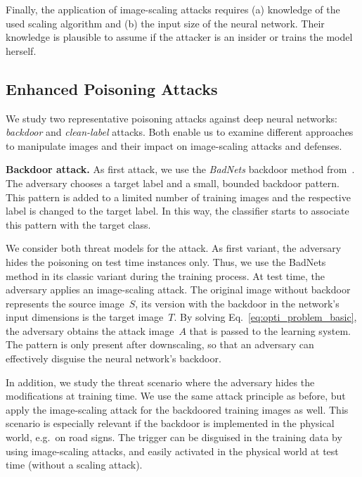 \documentclass[conference]{IEEEtran}
\renewcommand{\paragraph}[1]{{\vskip 8pt \noindent\bf #1 }}
\newcommand{\srcimg}{\ensuremath{S}\xspace}
\newcommand{\tarimg}{\ensuremath{T}\xspace}
\newcommand{\attimg}{\ensuremath{A}\xspace}
\begin{document}
\vspace{0.5em}
Finally, the application of image-scaling attacks
requires (a) knowledge of the used scaling algorithm and (b) the input 
size of the neural network. Their knowledge is plausible to assume if 
the attacker is an insider or trains the model herself.





\subsection{Enhanced Poisoning Attacks}
\label{subsec:poisoningwithimagescaling}
We study two representative poisoning attacks against deep neural 
networks: \emph{backdoor} and \emph{clean-label} attacks.
Both enable us to examine different {approaches\EndAccSupp{}} to manipulate images and 
their impact on image-scaling attacks and defenses. 


\paragraph{Backdoor attack.}
As first attack, we use the \emph{BadNets} backdoor method 
from~\citet{GuDolGar17}. The adversary chooses a target label and a 
small, bounded backdoor pattern. This pattern is added to a limited 
number of training images and the respective label is changed to the 
target label. In this way, the classifier starts to associate this 
pattern with the target class.

We consider both threat models for the attack. As first variant, the 
adversary hides the poisoning on test time instances only. Thus, 
we use the BadNets method in its classic variant during the training 
process.
At test time, the adversary {applies\EndAccSupp{}} an image-scaling attack. The 
original image without backdoor represents the source image~\srcimg, 
its version with the backdoor in the network's input dimensions is the 
target image~\tarimg. By solving Eq.~\eqref{eq:opti_problem_basic}, the 
adversary obtains the attack image~\attimg that is passed to the 
learning system.
The pattern is only present after downscaling, so that an adversary can 
effectively disguise the neural network's backdoor.

In addition, we study the threat scenario where the adversary hides the 
modifications at training time. We use the same 
attack principle as before, but apply the image-scaling attack for the 
backdoored training images as well. 
This scenario is especially relevant if the backdoor is {implemented\EndAccSupp{}} in 
the physical world, e.g.\ on road signs. The trigger can be disguised 
in the training data by using image-scaling attacks, and easily 
{activated\EndAccSupp{}} in the physical world at test time (without a scaling attack).
\end{document}
